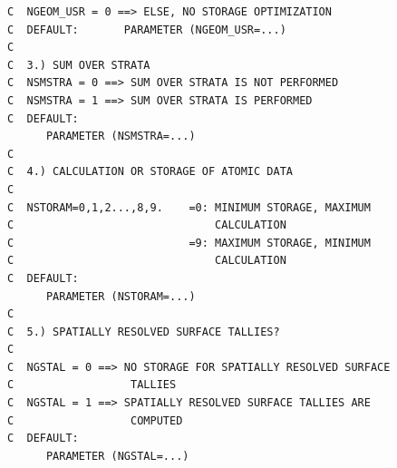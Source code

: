 \begin{lstlisting}
C  NGEOM_USR = 0 ==> ELSE, NO STORAGE OPTIMIZATION
C  DEFAULT:       PARAMETER (NGEOM_USR=...)
C
C  3.) SUM OVER STRATA
C  NSMSTRA = 0 ==> SUM OVER STRATA IS NOT PERFORMED
C  NSMSTRA = 1 ==> SUM OVER STRATA IS PERFORMED
C  DEFAULT:
      PARAMETER (NSMSTRA=...)
C
C  4.) CALCULATION OR STORAGE OF ATOMIC DATA
C
C  NSTORAM=0,1,2...,8,9.    =0: MINIMUM STORAGE, MAXIMUM
C                               CALCULATION
C                           =9: MAXIMUM STORAGE, MINIMUM
C                               CALCULATION
C  DEFAULT:
      PARAMETER (NSTORAM=...)
C
C  5.) SPATIALLY RESOLVED SURFACE TALLIES?
C
C  NGSTAL = 0 ==> NO STORAGE FOR SPATIALLY RESOLVED SURFACE 
C                  TALLIES
C  NGSTAL = 1 ==> SPATIALLY RESOLVED SURFACE TALLIES ARE 
C                  COMPUTED
C  DEFAULT:
      PARAMETER (NGSTAL=...)
\end{lstlisting} 

